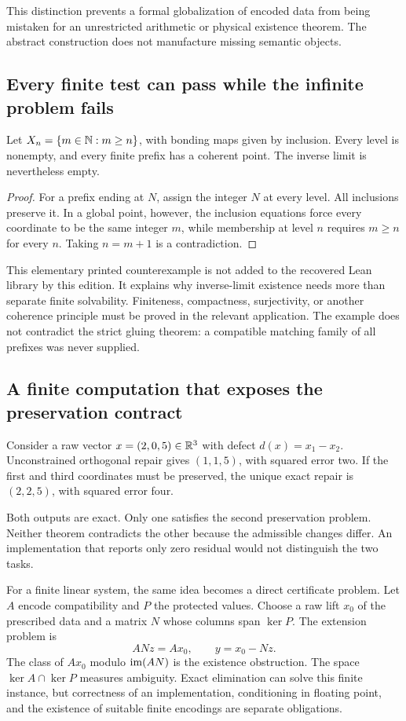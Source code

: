 This distinction prevents a formal globalization of encoded data from being mistaken for an unrestricted arithmetic or physical existence theorem. The abstract construction does not manufacture missing semantic objects.

\subsection{Every finite test can pass while the infinite problem fails}
\begin{example}\label{KS54}
Let \(X_n=\{m\in\mathbb N:m\ge n\}\), with bonding maps given by inclusion. Every level is nonempty, and every finite prefix has a coherent point. The inverse limit is nevertheless empty.
\end{example}
\begin{proof}
For a prefix ending at \(N\), assign the integer \(N\) at every level. All inclusions preserve it. In a global point, however, the inclusion equations force every coordinate to be the same integer \(m\), while membership at level \(n\) requires \(m\ge n\) for every \(n\). Taking \(n=m+1\) is a contradiction.
\end{proof}
This elementary printed counterexample is not added to the recovered Lean library by this edition. It explains why inverse-limit existence needs more than separate finite solvability. Finiteness, compactness, surjectivity, or another coherence principle must be proved in the relevant application. The example does not contradict the strict gluing theorem: a compatible matching family of all prefixes was never supplied.

\subsection{A finite computation that exposes the preservation contract}
Consider a raw vector \(x=(2,0,5)\in\mathbb R^3\) with defect \(d(x)=x_1-x_2\). Unconstrained orthogonal repair gives \((1,1,5)\), with squared error two. If the first and third coordinates must be preserved, the unique exact repair is \((2,2,5)\), with squared error four.

Both outputs are exact. Only one satisfies the second preservation problem. Neither theorem contradicts the other because the admissible changes differ. An implementation that reports only zero residual would not distinguish the two tasks.

For a finite linear system, the same idea becomes a direct certificate problem. Let \(A\) encode compatibility and \(P\) the protected values. Choose a raw lift \(x_0\) of the prescribed data and a matrix \(N\) whose columns span \(\ker P\). The extension problem is
\[
 ANz=Ax_0,\qquad y=x_0-Nz.
\]
The class of \(Ax_0\) modulo \(\operatorname{im}(AN)\) is the existence obstruction. The space \(\ker A\cap\ker P\) measures ambiguity. Exact elimination can solve this finite instance, but correctness of an implementation, conditioning in floating point, and the existence of suitable finite encodings are separate obligations.

